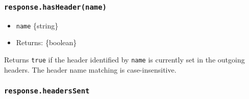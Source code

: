 \begin{Shaded}
\begin{Highlighting}[]
\NormalTok{(}\OperatorTok{,} \NormalTok{)}\OperatorTok{;}
\NormalTok{(}\OperatorTok{,}\NormalTok{ [}\OperatorTok{,} \NormalTok{])}\OperatorTok{;}

\OperatorTok{=}\NormalTok{()}\OperatorTok{;}
\end{Highlighting}
\end{Shaded}

\subsubsection{\texorpdfstring{\texttt{response.hasHeader(name)}}{response.hasHeader(name)}}\label{response.hasheadername}

\begin{itemize}
\tightlist
\item
  \texttt{name} \{string\}
\item
  Returns: \{boolean\}
\end{itemize}

Returns \texttt{true} if the header identified by \texttt{name} is
currently set in the outgoing headers. The header name matching is
case-insensitive.

\begin{Shaded}
\begin{Highlighting}[]
\OperatorTok{=}\NormalTok{(}\NormalTok{)}\OperatorTok{;}
\end{Highlighting}
\end{Shaded}

\subsubsection{\texorpdfstring{\texttt{response.headersSent}}{response.headersSent}}\label{response.headerssent}

